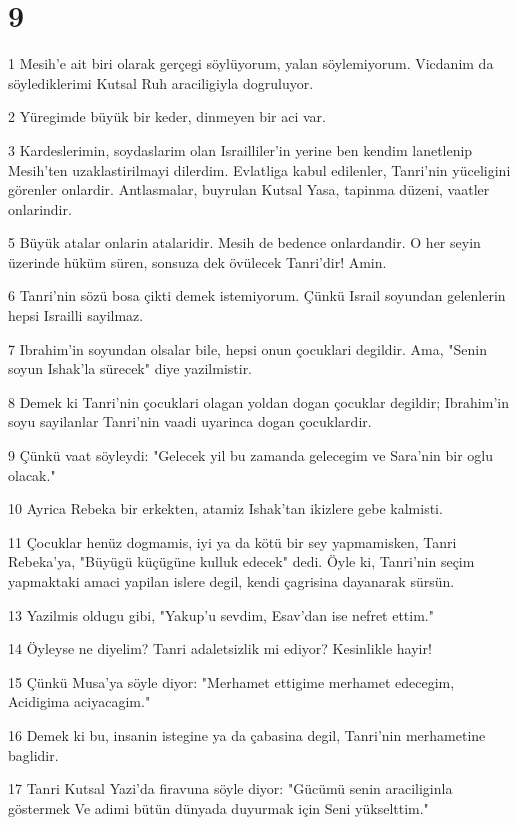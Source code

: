 \chapter{9}

\par 1 Mesih'e ait biri olarak gerçegi söylüyorum, yalan söylemiyorum. Vicdanim da söylediklerimi Kutsal Ruh araciligiyla dogruluyor.
\par 2 Yüregimde büyük bir keder, dinmeyen bir aci var.
\par 3 Kardeslerimin, soydaslarim olan Israilliler'in yerine ben kendim lanetlenip Mesih'ten uzaklastirilmayi dilerdim. Evlatliga kabul edilenler, Tanri'nin yüceligini görenler onlardir. Antlasmalar, buyrulan Kutsal Yasa, tapinma düzeni, vaatler onlarindir.
\par 5 Büyük atalar onlarin atalaridir. Mesih de bedence onlardandir. O her seyin üzerinde hüküm süren, sonsuza dek övülecek Tanri'dir! Amin.
\par 6 Tanri'nin sözü bosa çikti demek istemiyorum. Çünkü Israil soyundan gelenlerin hepsi Israilli sayilmaz.
\par 7 Ibrahim'in soyundan olsalar bile, hepsi onun çocuklari degildir. Ama, "Senin soyun Ishak'la sürecek" diye yazilmistir.
\par 8 Demek ki Tanri'nin çocuklari olagan yoldan dogan çocuklar degildir; Ibrahim'in soyu sayilanlar Tanri'nin vaadi uyarinca dogan çocuklardir.
\par 9 Çünkü vaat söyleydi: "Gelecek yil bu zamanda gelecegim ve Sara'nin bir oglu olacak."
\par 10 Ayrica Rebeka bir erkekten, atamiz Ishak'tan ikizlere gebe kalmisti.
\par 11 Çocuklar henüz dogmamis, iyi ya da kötü bir sey yapmamisken, Tanri Rebeka'ya, "Büyügü küçügüne kulluk edecek" dedi. Öyle ki, Tanri'nin seçim yapmaktaki amaci yapilan islere degil, kendi çagrisina dayanarak sürsün.
\par 13 Yazilmis oldugu gibi, "Yakup'u sevdim, Esav'dan ise nefret ettim."
\par 14 Öyleyse ne diyelim? Tanri adaletsizlik mi ediyor? Kesinlikle hayir!
\par 15 Çünkü Musa'ya söyle diyor: "Merhamet ettigime merhamet edecegim, Acidigima aciyacagim."
\par 16 Demek ki bu, insanin istegine ya da çabasina degil, Tanri'nin merhametine baglidir.
\par 17 Tanri Kutsal Yazi'da firavuna söyle diyor: "Gücümü senin araciliginla göstermek Ve adimi bütün dünyada duyurmak için Seni yükselttim."
